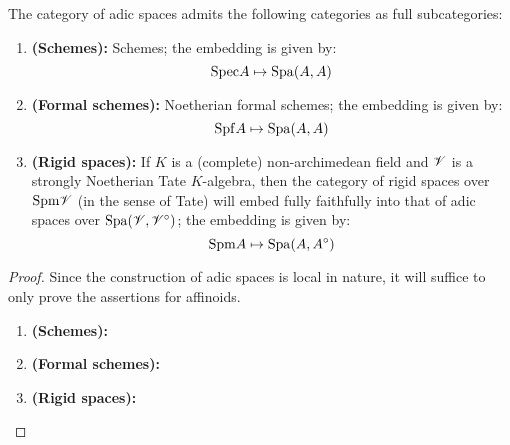                     \begin{theorem} \label{theorem: schemes_formal_schemes_rigid_spaces_and_adic_spaces}
                        The category of adic spaces admits the following categories as full subcategories:
                            \begin{enumerate}
                                \item \textbf{(Schemes):} Schemes; the embedding is given by:
                                    $$\mathrm{Spec} A \mapsto \mathrm{Spa}(A, A)$$
                                \item \textbf{(Formal schemes):} Noetherian formal schemes; the embedding is given by:
                                    $$\mathrm{Spf} A \mapsto \mathrm{Spa}(A, A)$$
                                \item \textbf{(Rigid spaces):} If $K$ is a (complete) non-archimedean field and $\mathscr{V}$ is a strongly Noetherian Tate $K$-algebra, then the category of rigid spaces over $\mathrm{Spm} \mathscr{V}$ (in the sense of Tate) will embed fully faithfully into that of adic spaces over $\mathrm{Spa}(\mathscr{V}, \mathscr{V}^{\circ})$; the embedding is given by:
                                    $$\mathrm{Spm} A \mapsto \mathrm{Spa}(A, A^{\circ})$$
                            \end{enumerate}
                    \end{theorem}
                        \begin{proof}
                            Since the construction of adic spaces is local in nature, it will suffice to only prove the assertions for affinoids.
                            \begin{enumerate}
                                \item \textbf{(Schemes):}
                                \item \textbf{(Formal schemes):}
                                \item \textbf{(Rigid spaces):}
                            \end{enumerate}
                        \end{proof}
                

